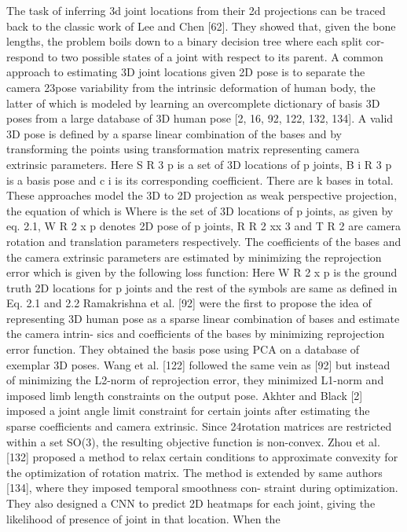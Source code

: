 The task of inferring 3d joint locations from their 2d projections can be traced
back to the classic work of Lee and Chen [62]. They showed that, given the bone
lengths, the problem boils down to a binary decision tree where each split cor-
respond to two possible states of a joint with respect to its parent. A common
approach to estimating 3D joint locations given 2D pose is to separate the camera
23pose variability from the intrinsic deformation of human body, the latter of which
is modeled by learning an overcomplete dictionary of basis 3D poses from a large
database of 3D human pose [2, 16, 92, 122, 132, 134]. A valid 3D pose is defined
by a sparse linear combination of the bases and by transforming the points using
transformation matrix representing camera extrinsic parameters.
Here S  R 3 p is a set of 3D locations of p joints, B i  R 3 p is a basis pose and c i is
its corresponding coefficient. There are k bases in total. These approaches model
the 3D to 2D projection as weak perspective projection, the equation of which is
Where  is the set of 3D locations of p joints, as given by eq. 2.1, W 
R 2 x p denotes 2D pose of p joints, R   R 2 xx 3 and T   R 2 are camera rotation and
translation parameters respectively. The coefficients of the bases and the camera
extrinsic parameters are estimated by minimizing the reprojection error which is
given by the following loss function:
Here W  R 2 x p is the ground truth 2D locations for p joints and the rest of the
symbols are same as defined in Eq. 2.1 and 2.2
Ramakrishna et al. [92] were the first to propose the idea of representing 3D
human pose as a sparse linear combination of bases and estimate the camera intrin-
sics and coefficients of the bases by minimizing reprojection error function. They
obtained the basis pose using PCA on a database of exemplar 3D poses. Wang et
al. [122] followed the same vein as [92] but instead of minimizing the L2-norm of
reprojection error, they minimized L1-norm and imposed limb length constraints
on the output pose. Akhter and Black [2] imposed a joint angle limit constraint for
certain joints after estimating the sparse coefficients and camera extrinsic. Since
24rotation matrices are restricted within a set SO(3), the resulting objective function
is non-convex. Zhou et al. [132] proposed a method to relax certain conditions
to approximate convexity for the optimization of rotation matrix. The method is
extended by same authors [134], where they imposed temporal smoothness con-
straint during optimization. They also designed a CNN to predict 2D heatmaps for
each joint, giving the likelihood of presence of joint in that location. When the
